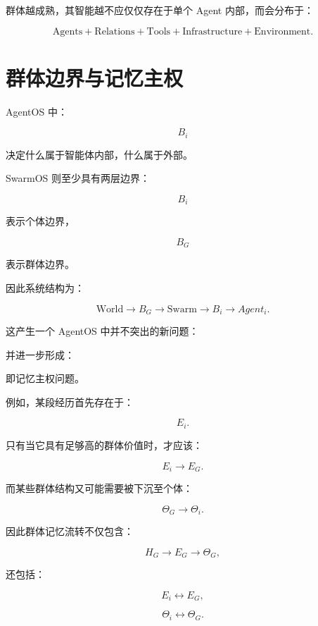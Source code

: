 群体越成熟，其智能越不应仅仅存在于单个 Agent 内部，而会分布于：

\[
\text{Agents}
+
\text{Relations}
+
\text{Tools}
+
\text{Infrastructure}
+
\text{Environment}.
\]


\section{群体边界与记忆主权}

AgentOS 中：

\[
B_i
\]

决定什么属于智能体内部，什么属于外部。

SwarmOS 则至少具有两层边界：

\[
B_i
\]

表示个体边界，

\[
B_G
\]

表示群体边界。

因此系统结构为：

\[
\text{World}
\rightarrow
B_G
\rightarrow
\text{Swarm}
\rightarrow
B_i
\rightarrow
Agent_i.
\]

这产生一个 AgentOS 中并不突出的新问题：

\begin{statementbox}
\centering
{}
\end{statementbox}

并进一步形成：

\begin{statementbox}
\centering
{}
\end{statementbox}

即记忆主权问题。

例如，某段经历首先存在于：

\[
E_i.
\]

只有当它具有足够高的群体价值时，才应该：

\[
E_i
\rightarrow
E_G.
\]

而某些群体结构又可能需要被下沉至个体：

\[
\Theta_G
\rightarrow
\Theta_i.
\]

因此群体记忆流转不仅包含：

\[
H_G
\rightarrow
E_G
\rightarrow
\Theta_G,
\]

还包括：

\[
E_i
\leftrightarrow
E_G,
\]

\[
\Theta_i
\leftrightarrow
\Theta_G.
\]

